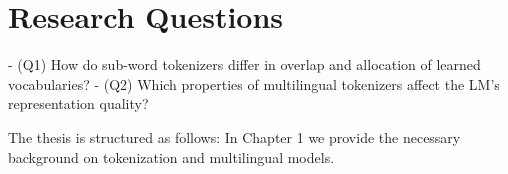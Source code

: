 
\section{Research Questions}


- (Q1) How do sub-word tokenizers differ in overlap and allocation of learned vocabularies?
- (Q2) Which properties of multilingual tokenizers affect the LM’s representation quality?



The thesis is structured as follows: In Chapter 1 we provide the necessary background on tokenization and multilingual models.  





